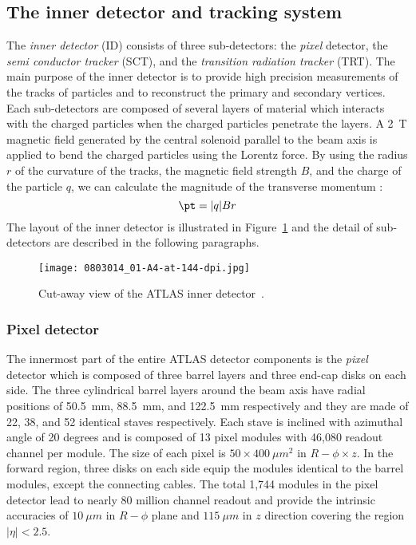 
\subsection{The inner detector and tracking system}
\label{subsec:ae_inner_detector}
The \textit{inner detector} (ID) consists of three sub-detectors: the \textit{pixel} detector, the \textit{semi conductor tracker}  (SCT), and the \textit{transition radiation tracker} (TRT).
The main purpose of the inner detector is to provide high precision measurements of the tracks of particles and to reconstruct the primary and secondary vertices.
Each sub-detectors are composed of several layers of material which interacts with the charged particles when the charged particles penetrate the layers.
A  2~T magnetic field generated by the central solenoid parallel to the beam axis is applied to bend the charged particles using the Lorentz force.
By using the radius $r$ of the curvature of the tracks, the magnetic field strength $B$, and the charge of the particle $q$, we can calculate the magnitude of the transverse momentum \pt:
%
\begin{equation}
\pt = |q|Br
\end{equation}
%
The layout of the inner detector is illustrated in Figure~\ref{fig:ae_inner_detector} and the detail of sub-detectors are described in the following paragraphs.

\begin{figure}[htbp]
\begin{center}
\texttt{[image: 0803014\_01-A4-at-144-dpi.jpg]}
\caption{Cut-away view of the ATLAS inner detector~\cite{1748-0221-3-08-S08003}.}
\label{fig:ae_inner_detector}
\end{center}
\end{figure}


\subsubsection{Pixel detector}
\label{subsubsec:ae_pixel}
The innermost part of the entire ATLAS detector components is the \textit{pixel} detector which is composed of three barrel layers and three end-cap disks on each side.
The three cylindrical barrel layers around the beam axis have radial positions of 50.5~mm, 88.5~mm, and 122.5~mm respectively and they are made of 22, 38, and 52 identical staves respectively.
Each stave is inclined with azimuthal angle of 20 degrees and is composed of 13 pixel modules with 46,080 readout channel per module.
The size of each pixel is $50 \times 400~\mu m^{2}$ in $R-\phi \times z$.
In the forward region, three disks on each side equip the modules identical to the barrel modules, except the connecting cables. 
The total 1,744 modules in the pixel detector lead to nearly 80 million channel readout and provide the intrinsic accuracies of $10~\mu m$ in $R-\phi$ plane and $115~\mu m$ in $z$ direction covering the region $|\eta| < 2.5$. 

